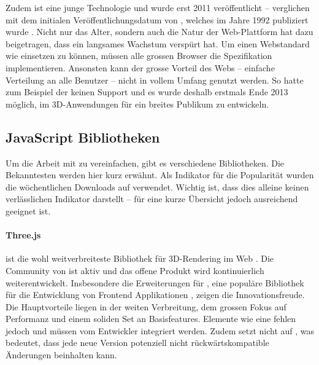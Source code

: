 Zudem ist  eine junge Technologie und wurde erst 2011 veröffentlicht \cite{webGl1Spec} – verglichen mit dem initialen Veröffentlichungsdatum von , welches im Jahre 1992 publiziert wurde \cite{openGlSpec}.
Nicht nur das Alter, sondern auch die Natur der Web-Plattform hat dazu beigetragen, dass  ein langsames Wachstum verspürt hat. Um einen Webstandard wie  einsetzen zu können, müssen alle grossen Browser die Spezifikation implementieren. Ansonsten kann der grosse Vorteil des Webs – einfache Verteilung an alle Benutzer – nicht in vollem Umfang genutzt werden. So hatte zum Beispiel der  keinen Support und es wurde deshalb erstmals Ende 2013 möglich, im  3D-Anwendungen für ein breites Publikum zu entwickeln.

\subsection{JavaScript Bibliotheken}
Um die Arbeit mit  zu vereinfachen, gibt es verschiedene  Bibliotheken. Die Bekanntesten werden hier kurz erwähnt. Als Indikator für die Popularität wurden die wöchentlichen Downloads auf  verwendet. Wichtig ist, dass dies alleine keinen verlässlichen Indikator darstellt – für eine kurze Übersicht jedoch ausreichend geeignet ist.

\paragraph{Three.js}
 ist die wohl weitverbreiteste Bibliothek für 3D-Rendering im Web \cite{threeNpmPackage}.
Die Community von  ist aktiv und das offene Produkt wird kontinuierlich weiterentwickelt. Insbesondere die Erweiterungen \cite{threeFiberGithub} für , eine populäre Bibliothek für die Entwicklung von Frontend Applikationen \cite{reactNpmPackage}, zeigen die Innovationsfreude.
Die Hauptvorteile liegen in der weiten Verbreitung, dem grossen Fokus auf Performanz und einem soliden Set an Basisfeatures. Elemente wie eine  fehlen jedoch und müssen vom Entwickler integriert werden. Zudem setzt  nicht auf , was bedeutet, dass jede neue Version potenziell nicht rückwärtskompatible Änderungen beinhalten kann.

